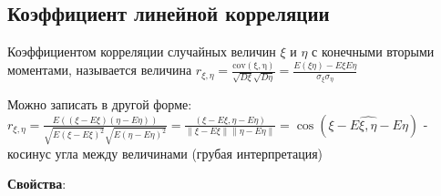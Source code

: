\documentclass[12pt]{article}
\begin{document}
\subsection{Коэффициент линейной корреляции}

\hypertarget{correlation}{}

\Def Коэффициентом корреляции случайных величин $\xi$ и $\eta$ с конечными вторыми моментами,
называется величина $r_{\xi,\eta} = \frac{\mathrm{cov(\xi, \eta)}}{\sqrt{D\xi} \sqrt{D\eta}} = \frac{E(\xi\eta) - E\xi E\eta}{\sigma_\xi \sigma_\eta}$

Можно записать в другой форме: $r_{\xi,\eta} = \frac{E((\xi - E\xi)(\eta - E\eta))}{\sqrt{E(\xi - E\xi)^2}\sqrt{E(\eta - E\eta)^2}} = 
\frac{(\xi - E\xi, \eta - E\eta)}{\|\xi - E\xi\|\|\eta - E\eta\|} = \cos(\widehat{\xi - E\xi, \eta - E\eta})$ - косинус угла между величинами (грубая интерпретация)

\mediumvspace

\textbf{Свойства}:
\end{document}

